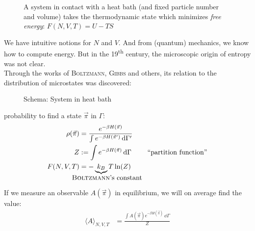 \begin{figure}
\centering
{}
\caption{A system in contact with a heat bath (and fixed particle number and volume) takes the thermodynamic state which minimizes \emph{free energy}:
$F(N, V, T) = U - TS$}
\label{pic:free_energy}
\end{figure}
\newpage

We have intuitive notions for $N$ and $V$. And from (quantum) mechanics, we know how to compute energy. But in the 19\textsuperscript{th} century, the microscopic origin of entropy was not clear.\\

Through the works of \textsc{Boltzmann}, \textsc{Gibbs} and others, its relation to the distribution of microstates was discovered:

\begin{figure}[!h]
\centering
{}
\caption{Schema: System in heat bath}
\end{figure}

probability to find a state $\vec{\pi}$ in $\Gamma$: 
\begin{align}
\rho(\vec{\pi}) &= \frac{e^{-\beta H(\vec{\pi})}}{\int e^{-\beta H(\vec{\pi}^\prime)}\ \dd\Gamma^\prime}\\
Z &:= \int e^{-\beta H(\vec{\pi})}\ \dd\Gamma \qquad\text{ ``partition function''}\\
F(N, V, T) &= -\underbrace{k_B}_{\parbox{0cm}{\text{\textsc{\hspace*{-1.5cm}Boltzmann}'s constant}}}T\ln(Z)
\end{align}

If we measure an observable $A(\vec{\pi})$ in equilibrium, we will on average find the value:
\begin{align}
	\langle A\rangle_{N, V, T} &= \frac{\int A(\vec{\pi})e^{-\beta H(\vec{\pi})}\ \dd\Gamma}{Z}
\end{align}


